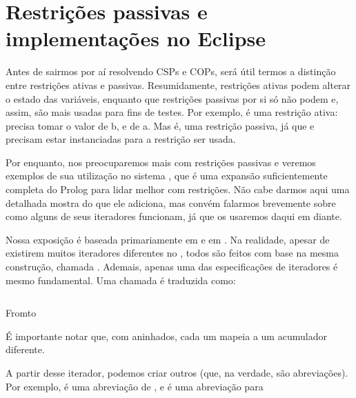 
%

%

\section{Restrições passivas e implementações no Eclipse}

Antes de sairmos por aí resolvendo CSPs e COPs, será útil termos a
distinção entre restrições ativas e passivas. Resumidamente,
restrições ativas podem alterar o estado das variáveis, enquanto que
restrições passivas por si só não podem e, assim, são mais usadas para
fins de testes. Por exemplo,  é uma restrição
ativa:  precisa tomar o valor de b, e  de a. Mas
 é, uma restrição passiva, já que  e 
precisam estar instanciadas para a restrição ser usada.

Por enquanto, nos preocuparemos mais com restrições passivas e veremos
exemplos de sua utilização no sistema \eclipse, que é uma expansão
suficientemente completa do Prolog para lidar melhor com
restrições. Não cabe darmos aqui uma detalhada mostra do que ele
adiciona, mas convém falarmos brevemente sobre como alguns de seus
iteradores funcionam, já que os usaremos daqui em diante.

Nossa exposição é baseada primariamente em \cite{joachim} e em
\cite{schimpf}. Na realidade, apesar de existirem muitos iteradores
diferentes no \eclipse, todos são feitos com base na mesma construção,
chamada . Ademais, apenas uma das especificações de
iteradores é mesmo fundamental. Uma chamada  é traduzida como:

\begin{listing}
  \inputminted{prolog}{../Exemplos/Cap8/prog8_fromto.pl}
  \caption{Fromto}
\end{listing}

\noindent É importante notar que, com  aninhados,
cada um mapeia a um acumulador diferente.

A partir desse iterador, podemos criar outros (que, na verdade, são
abreviações). Por exemplo,  é
uma abreviação de ,
e  é uma abreviação para 


